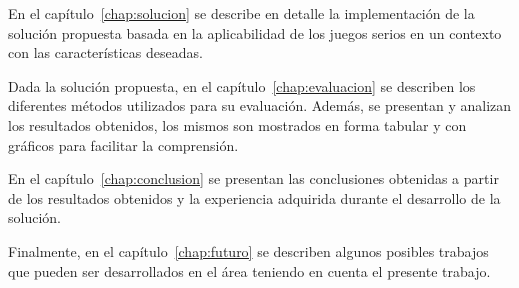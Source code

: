 En el capítulo~\ref{chap:solucion} se describe en detalle la implementación de
la solución propuesta basada en la aplicabilidad de los juegos serios en un
contexto con las características deseadas. 


Dada la solución propuesta, en el capítulo~\ref{chap:evaluacion} se describen
los diferentes métodos utilizados para su evaluación. Además, se presentan y
analizan los resultados obtenidos, los mismos son mostrados en forma tabular y
con gráficos para facilitar la comprensión.




 


En el capítulo~\ref{chap:conclusion} se presentan las conclusiones obtenidas a
partir de los resultados obtenidos y la experiencia adquirida durante el
desarrollo de la solución.


Finalmente, en el capítulo~\ref{chap:futuro} se describen algunos posibles trabajos
que pueden ser desarrollados en el área teniendo en cuenta el presente
trabajo. 

